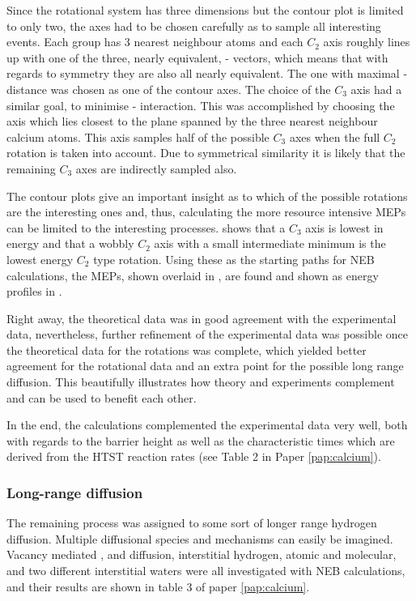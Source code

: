 Since the rotational system has three dimensions but the contour plot is limited to only two, the axes had to be chosen carefully as to sample all interesting events.
Each  group has 3 nearest neighbour  atoms and each $C_2$ axis roughly lines up with one of the three, nearly equivalent, - vectors, which means that with regards to symmetry they are also all nearly equivalent.
The one with maximal - distance was chosen as one of the contour axes.
The choice of the $C_3$ axis had a similar goal, to minimise - interaction.
This was accomplished by choosing the axis which lies closest to the plane spanned by the three nearest neighbour calcium atoms.
This axis samples half of the possible $C_3$ axes when the full $C_2$ rotation is taken into account.
Due to symmetrical similarity it is likely that the remaining $C_3$ axes are indirectly sampled also.

The contour plots give an important insight as to which of the possible rotations are the interesting ones and, thus, calculating the more resource intensive MEPs can be limited to the interesting processes.
 shows that a $C_3$ axis is lowest in energy and that a wobbly $C_2$ axis with a small intermediate minimum is the lowest energy $C_2$ type rotation.
Using these as the starting paths for NEB calculations, the MEPs, shown overlaid in , are found and shown as energy profiles in .

Right away, the theoretical data was in good agreement with the experimental data, nevertheless, further refinement of the experimental data was possible once the theoretical data for the rotations was complete, which yielded better agreement for the rotational data and an extra point for the possible long range diffusion.
This beautifully illustrates how theory and experiments complement and can be used to benefit each other.

In the end, the calculations complemented the experimental data very well, both with regards to the barrier height as well as the characteristic times which are derived from the HTST reaction rates (see Table 2 in Paper \ref{pap:calcium}).

\subsubsection{Long-range diffusion}
The remaining process was assigned to some sort of longer range hydrogen diffusion.
Multiple diffusional species and mechanisms can easily be imagined.
Vacancy mediated ,   and  diffusion, interstitial hydrogen, atomic and molecular, and two different interstitial waters were all investigated with NEB calculations, and their results are shown in table 3 of paper \ref{pap:calcium}.


